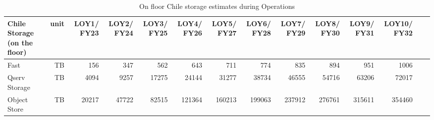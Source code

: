 \tiny \begin{longtable} { |p{}  |r  |r  |r  |r  |r  |r  |r  |r  |r  |r  |r  |r  |r |} 
\caption{On floor Chile storage estimates during Operations
 \label{tab:chileStorageOps}}\\ 
\hline 
\textbf{Chile Storage (on the floor)}&\textbf{unit}&\textbf{LOY1/ FY23}&\textbf{LOY2/ FY24}&\textbf{LOY3/ FY25}&\textbf{LOY4/ FY26}&\textbf{LOY5/ FY27}&\textbf{LOY6/ FY28}&\textbf{LOY7/ FY29}&\textbf{LOY8/ FY30}&\textbf{LOY9/ FY31}&\textbf{LOY10/ FY32}& \\ \hline
{Fast}&{TB}&{156}&{347}&{562}&{643}&{711}&{774}&{835}&{894}&{951}&{1006}& \\ \hline
{Qserv Storage}&{TB}&{4094}&{9257}&{17275}&{24144}&{31277}&{38734}&{46555}&{54716}&{63206}&{72017}& \\ \hline
{Object Store}&{TB}&{20217}&{47722}&{82515}&{121364}&{160213}&{199063}&{237912}&{276761}&{315611}&{354460}& \\ \hline
\end{longtable} \normalsize
